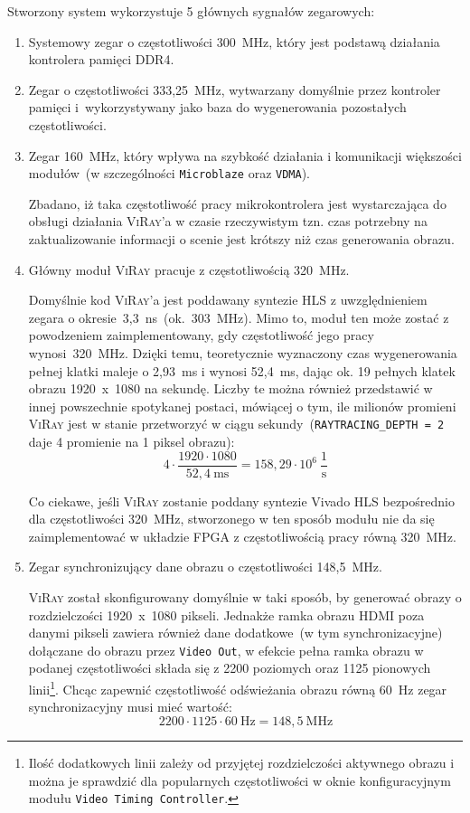 Stworzony system wykorzystuje 5 głównych sygnałów zegarowych:
\begin{enumerate}
\item Systemowy zegar o częstotliwości 300~MHz, który jest podstawą działania kontrolera pamięci DDR4.
\item Zegar o częstotliwości 333,25~MHz, wytwarzany domyślnie przez kontroler pamięci i~wykorzystywany jako baza do wygenerowania pozostałych częstotliwości.
\item Zegar 160~MHz, który wpływa na szybkość działania i komunikacji większości modułów~(w szczególności \texttt{Microblaze} oraz \texttt{VDMA}). 

Zbadano, iż taka częstotliwość pracy mikrokontrolera jest wystarczająca do obsługi działania \textsc{ViRay}'a w czasie rzeczywistym tzn. czas potrzebny na zaktualizowanie informacji o scenie jest krótszy niż czas generowania obrazu.

\item Główny moduł \textsc{ViRay} pracuje z częstotliwością 320~MHz.

Domyślnie kod \textsc{ViRay}'a jest poddawany syntezie HLS z uwzględnieniem zegara o okresie~3,3~ns~(ok.~303~MHz). Mimo to, moduł ten może zostać z powodzeniem zaimplementowany, gdy częstotliwość jego pracy wynosi~320~MHz. Dzięki temu, teoretycznie wyznaczony czas wygenerowania pełnej klatki maleje o 2,93~ms i wynosi 52,4~ms, dając ok. 19 pełnych klatek obrazu 1920~x~1080 na sekundę. Liczby te można również przedstawić w innej powszechnie spotykanej postaci, mówiącej o tym, ile milionów promieni \textsc{ViRay} jest w stanie przetworzyć w ciągu sekundy~(\texttt{RAYTRACING\_DEPTH = 2} daje 4 promienie na 1 piksel obrazu):
\begin{equation}
4\cdot\frac{1920\cdot 1080}{52,4~\mathrm{ms}}=158,29\cdot 10^6\ \mathrm{\frac{1}{s}}
\end{equation}

Co ciekawe, jeśli \textsc{ViRay} zostanie poddany syntezie Vivado HLS bezpośrednio dla częstotliwości 320~MHz, stworzonego w ten sposób modułu nie da się zaimplementować w układzie FPGA z częstotliwością pracy równą 320~MHz.

\item Zegar synchronizujący dane obrazu o częstotliwości 148,5~MHz.

\textsc{ViRay} został skonfigurowany domyślnie w taki sposób, by generować obrazy o rozdzielczości 1920~x~1080 pikseli. Jednakże ramka obrazu HDMI poza danymi pikseli zawiera również dane dodatkowe~(w tym synchronizacyjne) dołączane do obrazu przez \texttt{Video Out}, w efekcie pełna ramka obrazu w podanej częstotliwości składa się z 2200 poziomych oraz 1125 pionowych linii\footnote{Ilość dodatkowych linii zależy od przyjętej rozdzielczości aktywnego obrazu i można je sprawdzić dla popularnych częstotliwości w oknie konfiguracyjnym modułu \texttt{Video Timing Controller}.}. Chcąc zapewnić częstotliwość odświeżania obrazu równą 60~Hz zegar synchronizacyjny musi mieć wartość:
\begin{equation*}
2200\cdot 1125\cdot 60\ \mathrm{Hz} = 148,5\ \mathrm{MHz}
\end{equation*}
\end{enumerate}
